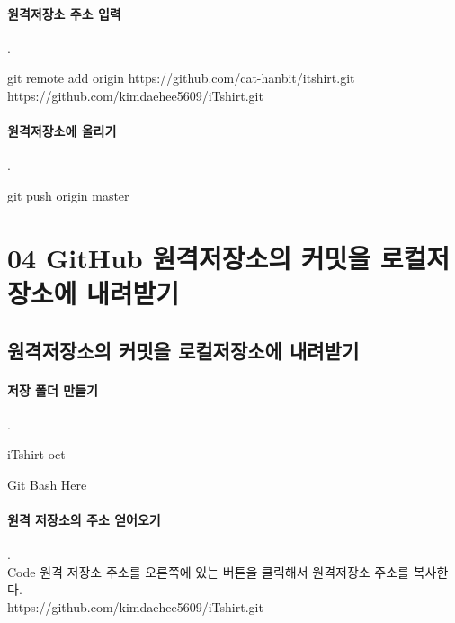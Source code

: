 \documentclass[12pt, a4paper, oneside]{book}
\let\stdsection\section
\renewcommand\section{\newpage\stdsection}
\begin{document}
			\paragraph{원격저장소 주소 입력}
			.\\
			\begin{tcolorbox}
				git remote add origin https://github.com/cat-hanbit/itshirt.git \\
									https://github.com/kimdaehee5609/iTshirt.git
			\end{tcolorbox}

			\paragraph{원격저장소에 올리기}
			.\\
			\begin{tcolorbox}
				git push origin master
			\end{tcolorbox}



	\section 	{04 GitHub 원격저장소의 커밋을 로컬저장소에 내려받기}

		\subsection 	{원격저장소의 커밋을 로컬저장소에 내려받기}

			\paragraph{저장 폴더 만들기}
			.\\

			\begin{tcolorbox}
				iTshirt-oct
			\end{tcolorbox}

			\begin{tcolorbox}
				Git Bash Here
			\end{tcolorbox}

			\paragraph{원격 저장소의 주소 얻어오기}
			.\\
			Code 원격 저장소 주소를 오른쪽에 있는 버튼을  클릭해서 원격저장소 주소를 복사한다.\\
			https://github.com/kimdaehee5609/iTshirt.git
\end{document}
